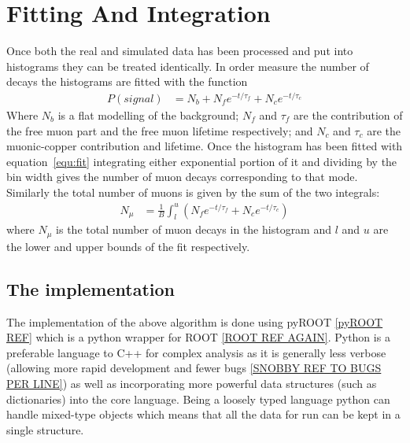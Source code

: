 \documentclass[]{article}
\begin{document}
\section{Fitting And Integration} %
\label{sec:fitting_and_integration}
Once both the real and simulated data has been processed and put into histograms they can be treated identically. In order measure the number of decays the histograms are fitted with the function 
\begin{align}
    P(signal) &= N_{b} + N_{f}e^{-t / \tau_{f}} + N_{c} e^{-t / \tau_{c}} \label{equ:fit}
\end{align}
Where $N_{b}$ is a flat modelling of the background; $N_{f}$ and $\tau_{f}$ are the contribution of the free muon part and the free muon lifetime respectively; and $N_{c}$ and $\tau_{c}$ are the muonic-copper contribution and lifetime. Once the histogram has been fitted with equation~\ref{equ:fit} integrating either exponential portion of it and dividing by the bin width gives the number of muon decays corresponding to that mode. Similarly the total number of muons is given by the sum of the two integrals:
\begin{align}
    N_{\mu} &= \frac{1}{B} \int_{l}^{u}\left(N_{f}e^{-t / \tau_{f}} + N_{c} e^{-t / \tau_{c}} \right) \label{equ:sum_exp_parts}
\end{align}
where $N_{\mu}$ is the total number of muon decays in the histogram and $l$ and $u$ are the lower and upper bounds of the fit respectively. 

\subsection{The implementation} %
\label{sub:the_implementation}
The implementation of the above algorithm is done using pyROOT \ref{pyROOT REF} which is a python wrapper for ROOT \ref{ROOT REF AGAIN}. Python is a preferable language to C++ for complex analysis as it is generally less verbose (allowing more rapid development and fewer bugs \ref{SNOBBY REF TO BUGS PER LINE}) as well as incorporating more powerful data structures (such as dictionaries) into the core language. Being a loosely typed language python can handle mixed-type objects which means that all the data for run can be kept in a single structure.
\end{document}
